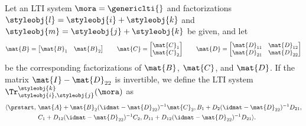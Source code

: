 \begin{ctdefinition}\label{def:trace-lti}
    Let an LTI system $\mora = \genericlti{}$ and factorizations $\styleobj{l} = \styleobj{i} + \styleobj{k}$ and $\styleobj{m} = \styleobj{j} + \styleobj{k}$ be given, and let
    \begin{equation}\label{eq:LTI-induced-block-forms}
        \mat{B} =
        \begin{bmatrix}
            \mat{B}_1 & \mat{B}_2
        \end{bmatrix}
        \qquad
        \mat{C} =
        \begin{bmatrix}
            \mat{C}_1 \\
            \mat{C}_2
        \end{bmatrix}
        \qquad
        \mat{D} =
        \begin{bmatrix}
            \mat{D}_{11} & \mat{D}_{12} \\
            \mat{D}_{21} & \mat{D}_{22}
        \end{bmatrix}
    \end{equation}
    be the corresponding factorizations of $\mat{B}$, $\mat{C}$, and $\mat{D}$.
    If the matrix $\mat{I} - \mat{D}_{22}$ is invertible, we define the LTI system $\Tr_{\styleobj{i},\styleobj{j}}^{\styleobj{k}}(\mora)$ as
    \begin{equation}
        \begin{aligned}
            \langle \prstart,  \  & \mat{A} + \mat{B}_2 (\idmat- \mat{D}_{22})^{-1} \mat{C}_2 , B_1 + D_2(\idmat- \mat{D}_{22})^{-1}
            D_{21}, \\
                                  & C_1 + D_{12}(\idmat- \mat{D}_{22})^{-1}C_2, D_{11} + D_{12}(\idmat- \mat{D}_{22})^{-1}D_{21} \rangle.
        \end{aligned}
    \end{equation}
\end{ctdefinition}

